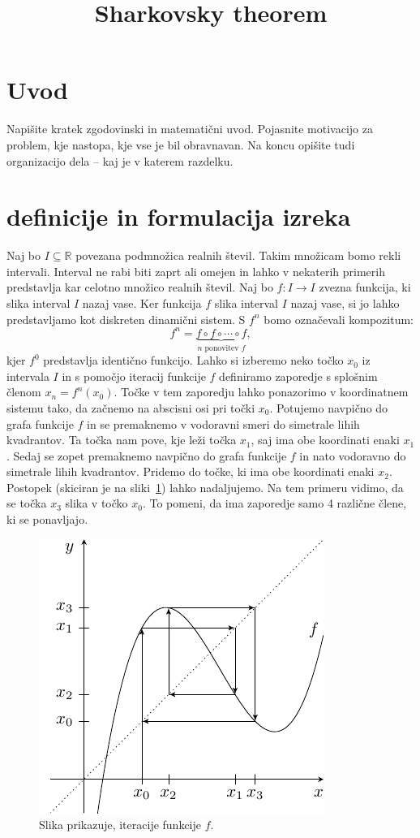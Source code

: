 \documentclass[mat2]{fmfdelo}
\title{Sharkovsky theorem}
\newcommand{\R}{\mathbb R}
\begin{document}
\section{Uvod}
Napišite kratek zgodovinski in matematični uvod.  Pojasnite motivacijo za problem, kje
nastopa, kje vse je bil obravnavan. Na koncu opišite tudi organizacijo dela -- kaj je v
katerem razdelku.

\section{definicije in formulacija izreka}
Naj bo $I\subseteq \R$ povezana podmnožica realnih števil. Takim množicam bomo rekli intervali. Interval ne rabi biti zaprt ali omejen in lahko v nekaterih primerih predstavlja kar celotno množico realnih števil. Naj bo $f:I \to I$ zvezna funkcija, ki slika interval $I$ nazaj vase. Ker funkcija $f$ slika interval $I$ nazaj vase, si jo lahko predstavljamo kot diskreten dinamični sistem. S $f^n$ bomo označevali kompozitum:
$$f^n = \underbrace{f \circ f \circ \cdots \circ f}_{n \text{ ponovitev } f},$$
kjer $f^0$ predstavlja identično funkcijo. Lahko si izberemo neko točko $x_0$ iz intervala $I$ in s pomočjo iteracij funkcije $f$ definiramo zaporedje s splošnim členom $x_n = f^n(x_0)$. Točke v tem zaporedju lahko ponazorimo v koordinatnem sistemu tako, da začnemo na abscisni osi pri točki $x_0$. Potujemo navpično do grafa funkcije $f$ in se premaknemo v vodoravni smeri do simetrale lihih kvadrantov. Ta točka nam pove, kje leži točka $x_1$, saj ima obe koordinati enaki $x_1$. Sedaj se zopet premaknemo navpično do grafa funkcije $f$ in nato vodoravno do simetrale lihih kvadrantov. Pridemo do točke, ki ima obe koordinati enaki $x_2$. Postopek (skiciran je na sliki~\ref{fig:iteracije}) lahko nadaljujemo. Na tem primeru vidimo, da se točka $x_3$ slika v točko $x_0$. To pomeni, da ima zaporedje samo 4 različne člene, ki se ponavljajo.

\begin{figure}[h]
  \centering
  \includegraphics[]{images/iteracije_f.pdf}
  \caption[Primer vektorske slike.]{Slika prikazuje, iteracije funkcije $f$.}
  \label{fig:iteracije}
\end{figure}
\end{document}
